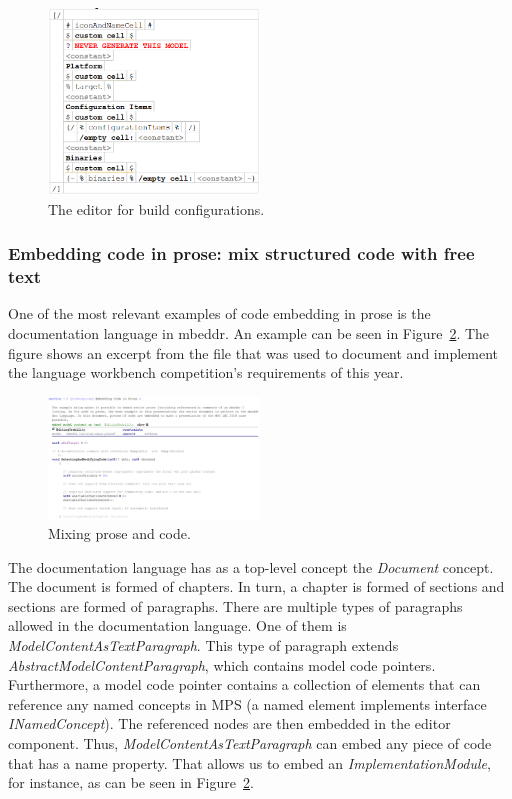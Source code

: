 \documentclass[preprint,numbers,10pt]{sigplanconf}
\begin{document}
\begin{figure}[H]
	\centering
	\includegraphics[width=0.50\textwidth]{screens/BuildConfigurationEditor.png}
	\caption{The editor for build configurations.}
	\label{fig:buildConfigEditor}
\end{figure}
\subsubsection{Embedding code in prose: mix structured code with free text}
One of the most relevant examples of code embedding in prose is the documentation language in mbeddr.
An example can be seen in Figure~\ref{fig:CodeInProse}. The figure shows an excerpt from the file
that was used to document and implement the language workbench competition's requirements of this year.

\begin{figure}[H]
	\centering
	\includegraphics[width=0.50\textwidth]{screens/CodeInProse.png}
	\caption{Mixing prose and code.}
	\label{fig:CodeInProse}
\end{figure}

The documentation language has as a top-level concept the \emph{Document} concept. The document is formed of chapters. In turn, a chapter
is formed of sections and sections are formed of paragraphs. There are multiple types of paragraphs allowed in
the documentation language. One of them is \emph{ModelContentAsTextParagraph}. This type of paragraph
extends \emph{AbstractModelContentParagraph}, which contains model code pointers. Furthermore, a model code pointer contains
a collection of elements that can reference any named concepts in MPS (a named element implements interface
\emph{INamedConcept}). The referenced nodes are then embedded in the editor component.
Thus, \emph{ModelContentAsTextParagraph} can embed any piece of code that has a name property.
That allows us to embed an \emph{ImplementationModule}, for instance, as can be seen in Figure~\ref{fig:CodeInProse}.
\end{document}
